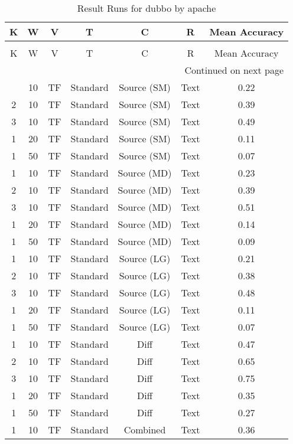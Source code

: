 \begin{longtable}{|c|c|c|c|c|c|c|}
\hline
K & W & V & T & C & R & Mean Accuracy \\
\hline
\endfirsthead
\caption[]{Continued from previous page} \\
\hline
K & W & V & T & C & R & Mean Accuracy \\
\hline
\endhead
\hline
\multicolumn{7}{r}{Continued on next page} \\
\endfoot
\hline
\caption{Result Runs for dubbo by apache} 
\label{result-runs-dubbo-apache}
\endlastfoot
1 & 10 & TF & Standard & Source (SM) & Text & 0.22 \\
\hline
2 & 10 & TF & Standard & Source (SM) & Text & 0.39 \\
\hline
3 & 10 & TF & Standard & Source (SM) & Text & 0.49 \\
\hline
1 & 20 & TF & Standard & Source (SM) & Text & 0.11 \\
\hline
1 & 50 & TF & Standard & Source (SM) & Text & 0.07 \\
\hline
1 & 10 & TF & Standard & Source (MD) & Text & 0.23 \\
\hline
2 & 10 & TF & Standard & Source (MD) & Text & 0.39 \\
\hline
3 & 10 & TF & Standard & Source (MD) & Text & 0.51 \\
\hline
1 & 20 & TF & Standard & Source (MD) & Text & 0.14 \\
\hline
1 & 50 & TF & Standard & Source (MD) & Text & 0.09 \\
\hline
1 & 10 & TF & Standard & Source (LG) & Text & 0.21 \\
\hline
2 & 10 & TF & Standard & Source (LG) & Text & 0.38 \\
\hline
3 & 10 & TF & Standard & Source (LG) & Text & 0.48 \\
\hline
1 & 20 & TF & Standard & Source (LG) & Text & 0.11 \\
\hline
1 & 50 & TF & Standard & Source (LG) & Text & 0.07 \\
\hline
1 & 10 & TF & Standard & Diff & Text & 0.47 \\
\hline
2 & 10 & TF & Standard & Diff & Text & 0.65 \\
\hline
3 & 10 & TF & Standard & Diff & Text & 0.75 \\
\hline
1 & 20 & TF & Standard & Diff & Text & 0.35 \\
\hline
1 & 50 & TF & Standard & Diff & Text & 0.27 \\
\hline
1 & 10 & TF & Standard & Combined & Text & 0.36 \\

\end{longtable}
